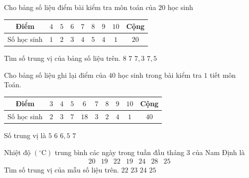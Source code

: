 \begin{ex}%
	Cho bảng số  liệu điểm bài kiểm tra môn toán của $20$ học sinh
	\begin{center}
		\begin{tabular}{|c|c|c|c|c|c|c|c|c|}
			\hline Điểm  & $4$ & $5$ & $6$ & $7$ & $8$ & $9$ & $10$ & Cộng\\
			\hline Số học sinh & $1$ & $2$ & $3$ & $4$ & $5$ & $4$ & $1$  & $20$\\
			\hline 
		\end{tabular}
	\end{center}
	Tìm số trung vị của bảng số  liệu trên.
	 \choice
		{$8$} 
		{$7$} 
		 {$7{,}3$}
		{\True  $7{,}5$}
\end{ex}

\begin{ex}%
	Cho bảng số liệu ghi lại điểm của $40$ học sinh trong bài kiểm tra $1$ tiết môn  Toán.
	\begin{center}
		\begin{tabular}{|c|c|c|c|c|c|c|c|c|c|}
			 \hline
			Điểm & $3$ & $4$ & $5$ & $6$  & $7$ & $8$ & $9$ & $10$ & Cộng\\
			\hline 
			Số học sinh & $2$ & $3$ & $7$ &  $18$ & $3$ & $2$ & $4$ & $1$ & $40$\\
			 \hline
		\end{tabular}
	\end{center}
	Số trung vị  là
	 \choice
		 {$5$}
		{\True $6$} 
		{$6{,}5$} 
		 {$7$}
\end{ex}

\begin{ex}%
	Nhiệt độ $\left({}^{\circ}\mathrm{C}\right)$ trung bình các ngày trong tuần đầu tháng $3$ của  Nam Định là
	 $$
	\begin{array}{lllllll}
		20 & 19 & 22 &  19 & 24 & 28 & 25
	\end{array}
	 $$
	 Tìm số trung vị của mẫu số liệu trên.
	\choice 
		 {\True $22$}
		 {$23$}
		 {$24$}
		{$25$} 
\end{ex}

